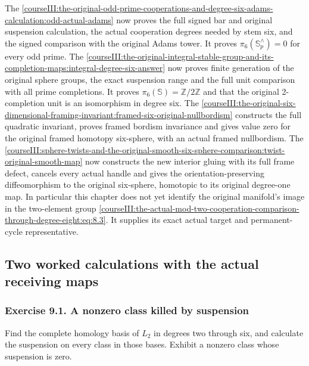 The \cref{courseIII:the-original-odd-prime-cooperations-and-degree-six-adams-calculation:odd-actual-adams} now proves the full signed bar and original suspension calculation, the actual cooperation degrees needed by stem six, and the signed comparison with the original Adams tower. It proves \(\pi_6(\mathbb S^{\wedge}_p)=0\) for every odd prime. The \cref{courseIII:the-original-integral-stable-group-and-its-completion-maps:integral-degree-six-answer} now proves finite generation of the original sphere groups, the exact suspension range and the full unit comparison with all prime completions. It proves \(\pi_6(\mathbb S)=\mathbb Z/2\mathbb Z\) and that the original 2-completion unit is an isomorphism in degree six. The \cref{courseIII:the-original-six-dimensional-framing-invariant:framed-six-original-nullbordism} constructs the full quadratic invariant, proves framed bordism invariance and gives value zero for the original framed homotopy six-sphere, with an actual framed nullbordism. The \cref{courseIII:sphere-twists-and-the-original-smooth-six-sphere-comparison:twist-original-smooth-map} now constructs the new interior gluing with its full frame defect, cancels every actual handle and gives the orientation-preserving diffeomorphism to the original six-sphere, homotopic to its original degree-one map. In particular this chapter does not yet identify the original manifold's image in the two-element group \eqref{courseIII:the-actual-mod-two-cooperation-comparison-through-degree-eight:eq:8.3}. It supplies its exact actual target and permanent-cycle representative.

\subsection{Two worked calculations with the actual receiving maps}
\label{courseIII:the-actual-mod-two-cooperation-comparison-through-degree-eight:actual-eight-exercises}

\label{courseIII:the-actual-mod-two-cooperation-comparison-through-degree-eight:section-9}

\subsubsection{Exercise 9.1. A nonzero class killed by suspension}
\label{courseIII:the-actual-mod-two-cooperation-comparison-through-degree-eight:exercise-9.1}

\label{courseIII:actual-degree8:9.1}

Find the complete homology basis of \(L_2\) in degrees two through six, and calculate the suspension on every class in those bases. Exhibit a nonzero class whose suspension is zero.

